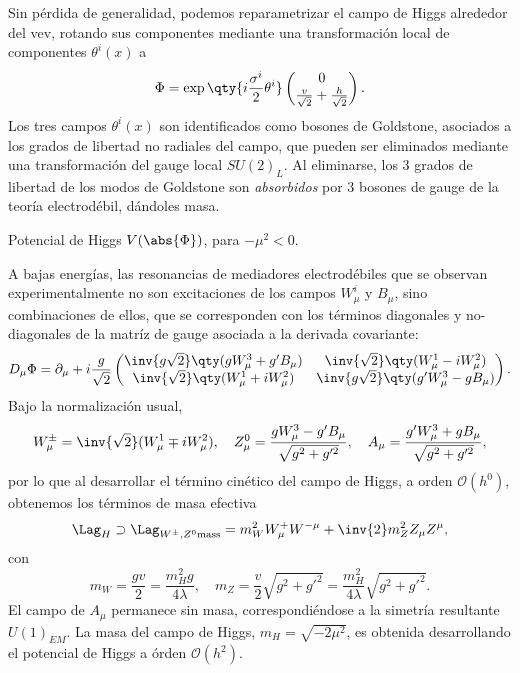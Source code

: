 Sin pérdida de generalidad, podemos reparametrizar el campo de Higgs alrededor del vev, rotando sus componentes mediante una transformación local de componentes $\theta^i(x)$ a
\[ \Phi = \exp\qty{i \frac{\sigma^i}{2} \theta^i} \begin{pmatrix} 0 \\ \frac{v}{\sqrt{2}} + \frac{h}{\sqrt{2}} \end{pmatrix}. \]
Los tres campos $\theta^i(x)$ son identificados como bosones de Goldstone, asociados a los grados de libertad no radiales del campo, que pueden ser eliminados mediante una transformación del gauge local $SU(2)_L$. Al eliminarse, los 3 grados de libertad de los modos de Goldstone son \textit{absorbidos} por 3 bosones de gauge de la teoría electrodébil, dándoles masa.

\begin{marginfigure}[-20em]
  \centering
  
  \caption{Potencial de Higgs $V(\abs{\Phi})$, para $-\mu^2 < 0$.}
  \label{fig:ch1:SM:Higgs_potential}
\end{marginfigure}

A bajas energías, las resonancias de mediadores electrodébiles que se observan experimentalmente no son excitaciones de los campos $W^i_\mu$ y $B_\mu$, sino combinaciones de ellos, que se corresponden con los términos diagonales y no-diagonales de la matríz de gauge asociada a la derivada covariante:
\[
  D_\mu \Phi = \partial_\mu + i \frac{g}{\sqrt{2}}
  \begin{pmatrix}
    \inv{g\sqrt{2}}\qty(g W^3_\mu + g' B_\mu) & \inv{\sqrt{2}} \qty(W^1_\mu - i W^2_\mu)  \\
    \inv{\sqrt{2}} \qty(W^1_\mu + i W^2_\mu)  & \inv{g\sqrt{2}}\qty(g' W^3_\mu - g B_\mu)
  \end{pmatrix}.
\]
Bajo la normalización usual,
\[ 
  W^\pm_\mu = \inv{\sqrt{2}}(W^1_\mu \mp i W^2_\mu), 
  \quad 
  Z^0_\mu = \frac{g W^3_\mu - g' B_\mu}{\sqrt{g^2+g'^2}},
  \quad
  A_\mu = \frac{g' W^3_\mu + g B_\mu}{\sqrt{g^2+g'^2}},
\]
por lo que al desarrollar el término cinético del campo de Higgs, a orden $\mathcal{O}(h^0)$, obtenemos los términos de masa efectiva
\[ \Lag_{H} \supset \Lag_{W^\pm, Z^0 \text{mass}} = m_W^2 W^+_\mu W^{-\mu} + \inv{2} m_Z^2 Z_\mu Z^\mu, \]
con
\[ m_W = \frac{gv}{2} = \frac{m_H^2 g}{4\lambda}, \quad m_Z = \frac{v}{2}\sqrt{g^2 + g'^2} = \frac{m_H^2}{4\lambda} \sqrt{g^2 + g'^2}. \]
El campo de $A_\mu$ permanece sin masa, correspondiéndose a la simetría resultante $U(1)_{EM}$. La masa del campo de Higgs, $m_H = \sqrt{-2\mu^2}$, es obtenida desarrollando el potencial de Higgs a órden $\mathcal{O}(h^2)$.

